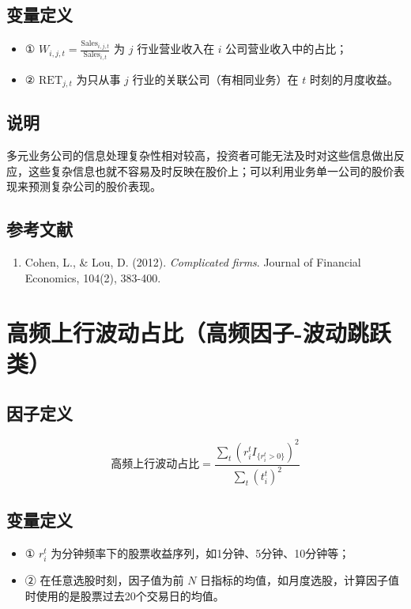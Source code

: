 \documentclass{article}
\begin{document}
\subsection{变量定义}
\begin{itemize}
    \item ① \( W_{i,j,t} = \frac{\mathrm{Sales}_{i,j,t}}{\mathrm{Sales}_{i,t}} \) 为 \( j \) 行业营业收入在 \( i \) 公司营业收入中的占比；
    \item ② \( \mathrm{RET}_{j,t} \) 为只从事 \( j \) 行业的关联公司（有相同业务）在 \( t \) 时刻的月度收益。
\end{itemize}

\subsection{说明}
多元业务公司的信息处理复杂性相对较高，投资者可能无法及时对这些信息做出反应，这些复杂信息也就不容易及时反映在股价上；可以利用业务单一公司的股价表现来预测复杂公司的股价表现。

\subsection{参考文献}
\begin{enumerate}
    \item Cohen, L., \& Lou, D. (2012). \textit{Complicated firms}. Journal of Financial Economics, 104(2), 383-400.
\end{enumerate}

\section{高频上行波动占比（高频因子-波动跳跃类）}

\subsection{因子定义}
\begin{equation}
    \text{高频上行波动占比} = \frac{\sum_t(r_i^tI_{\{r_i^t>0\}})^2}{\sum_t(t_i^t)^2}
\end{equation}

\subsection{变量定义}
\begin{itemize}
    \item ① \( r_{i}^t \) 为分钟频率下的股票收益序列，如1分钟、5分钟、10分钟等；
    \item ② 在任意选股时刻，因子值为前 \( N \) 日指标的均值，如月度选股，计算因子值时使用的是股票过去20个交易日的均值。
\end{itemize}
\end{document}
